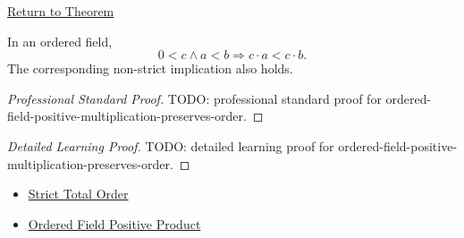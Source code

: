 \newpage
{}
\label{prf:ordered-field-positive-multiplication-preserves-order}

\begin{remark*}[Return]
\hyperref[thm:ordered-field-positive-multiplication-preserves-order]{Return to Theorem}
\end{remark*}

\begin{theorem*}
In an ordered field,
\[
0<c\land a<b
\Longrightarrow
c\cdot a<c\cdot b.
\]
The corresponding non-strict implication also holds.
\end{theorem*}

\begin{proof}[Professional Standard Proof]
\LRAProofBodyStart
TODO: professional standard proof for ordered-field-positive-multiplication-preserves-order.
\end{proof}

\begin{proof}[Detailed Learning Proof]
\LRAProofBodyStart
TODO: detailed learning proof for ordered-field-positive-multiplication-preserves-order.
\end{proof}

\begin{remark*}
\end{remark*}

\begin{dependencies}
\begin{itemize}
  \item \hyperref[def:strict-total-order]{Strict Total Order}
  \item \hyperref[thm:ordered-field-positive-product]{Ordered Field Positive Product}
\end{itemize}
\end{dependencies}

\clearpage
